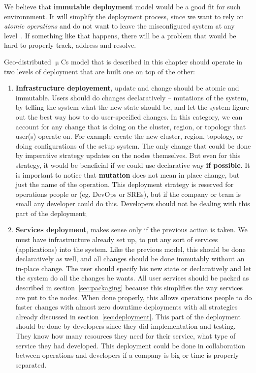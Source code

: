We believe that \textbf{immutable deployment} model would be a good fit for such environnment. It will simplify the deployment process, since we want to rely on \emph{atomic operations} and do not want to leave the misconfigured system at any level~\cite{SimicSensors}. If something like that happens, there will be a problem that would be hard to properly track, address and resolve.

Geo-distributed $\upmu$Cs model that is described in this chapter should operate in two levels of deployment that are built one on top of the other:

\begin{enumerate}[start=1,label={(\bfseries \arabic*)}]
	\item \textbf{Infrastructure deployement}, update and change should be atomic and immutable. Users should do changes declaratively -- mutations of the system, by telling the system what the new state should be, and let the system figure out the best way how to do user-specified changes. In this category, we can account for any change that is doing on the cluster, region, or topology that user(s) operate on. For example create the new cluster, region, topology, or doing configurations of the setup system. The only change that could be done by imperative strategy updates on the nodes themselves. But even for this strategy, it would be beneficial if we could use declarative way \textbf{if possible}. It is important to notice that \textbf{mutation} does not mean in place change, but just the name of the operation. This deployment strategy is reserved for operations people or (eg. DevOps or SREs), but if the company or team is small any developer could do this. Developers should not be dealing with this part of the deployment;
	\item \textbf{Services deployment}, makes sense only if the previous action is taken. We must have infrastructure already set up, to put any sort of services (applications) into the system. Like the previous model, this should be done declaratively as well, and all changes should be done immutably without an in-place change. The user should specify his new state or  declaratively and let the system do all the changes he wants. All user services should be packed as described in section~\ref{sec:packaging} because this simplifies the way services are put to the nodes. When done properly, this allows operations people to do faster changes with almost zero downtime deployments with all strategies already discussed in section~\ref{sec:deployment}. This part of the deployment should be done by developers since they did implementation and testing. They know how many resources they need for their service, what type of service they had developed. This deployment could be done in collaboration between operations and developers if a company is big or time is properly separated.
\end{enumerate}

